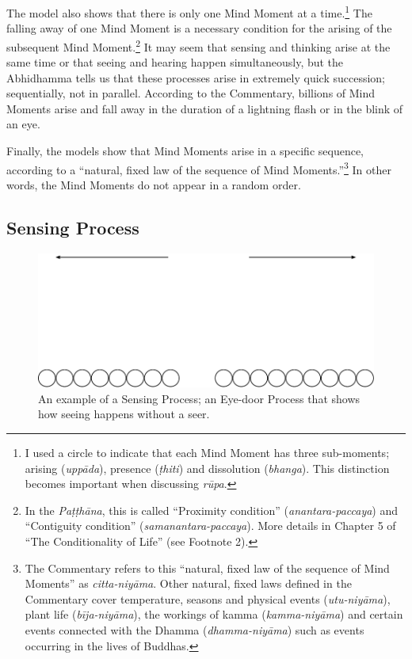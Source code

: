 The model also shows that there is only one Mind Moment at a time.\footnote{I used a circle to indicate that each Mind Moment has three sub-moments; arising (\textit{uppāda}), presence (\textit{ṭhiti}) and dissolution (\textit{bhanga}). This distinction becomes important when discussing \textit{rūpa}.} The falling away of one Mind Moment is a necessary condition for the arising of the subsequent Mind Moment.\footnote{In the \textit{Paṭṭhāna}, this is called “Proximity condition” (\textit{anantara-paccaya}) and “Contiguity condition” (\textit{samanantara-paccaya}). More details in Chapter 5 of “The Conditionality of Life” (see Footnote 2).} It may seem that sensing and thinking arise at the same time or that seeing and hearing happen simultaneously, but the Abhidhamma tells us that these processes arise in extremely quick succession; sequentially, not in parallel. According to the Commentary, billions of Mind Moments arise and fall away in the duration of a lightning flash or in the blink of an eye.

Finally, the models show that Mind Moments arise in a specific sequence, according to a “natural, fixed law of the sequence of Mind Moments.”\footnote{The Commentary refers to this “natural, fixed law of the sequence of Mind Moments” as \textit{citta-niyāma}. Other natural, fixed
laws defined in the Commentary cover temperature, seasons and physical events (\textit{utu-niyāma}), plant life
(\textit{bīja-niyāma}), the workings of kamma (\textit{kamma-niyāma}) and certain events connected with the
Dhamma (\textit{dhamma-niyāma}) such as events occurring in the lives of Buddhas.} In other words, the Mind Moments do not appear in a random order.

\subsection*{Sensing Process}

\begin{figure}[h]
\centering
\includegraphics[width=1\linewidth]{./Diagrams/Process}
\caption{An example of a Sensing Process; an Eye-door Process that shows how seeing happens without a seer.}
\label{fig:Process}
\end{figure}

